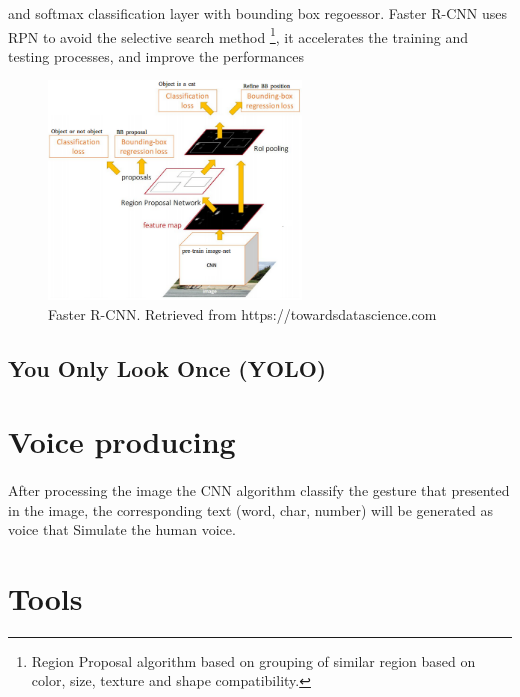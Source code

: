 \documentclass[12pt]{report}
\begin{document}
                and softmax classification layer with bounding box regoessor.
                Faster R-CNN uses RPN to avoid the 
                selective search method \footnote{ Region Proposal algorithm based on grouping of similar region based on color, size, texture and shape compatibility.}, 
                it accelerates the training and testing 
                processes, and improve the performances \cite{Ren2017a}
                \begin{figure}[h]
                \centering
                \includegraphics[width=0.6\textwidth]{./images/frcnn.png}
                \caption{Faster R-CNN. Retrieved from https://towardsdatascience.com}
                \label{fig:frcnn}
                \end{figure} 
                
                \subsection{You Only Look Once (YOLO)}



        \section{Voice producing}
        \paragraph{}
            After processing the image the CNN algorithm classify the gesture
            that presented in the image, the corresponding text (word, char, number)
            will be generated as voice that Simulate the human voice. 
        
        \section{Tools}
\end{document}
